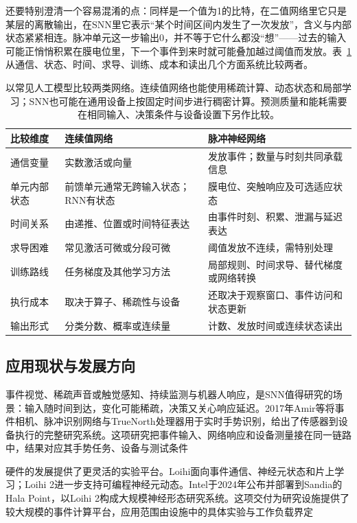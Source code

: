 还要特别澄清一个容易混淆的点：同样是一个值为1的比特，在二值网络里它只是某层的离散输出，在SNN里它表示“某个时间区间内发生了一次发放”，含义与内部状态紧紧相连。脉冲单元这一步输出0，并不等于它什么都没“想”——过去的输入可能正悄悄积累在膜电位里，下一个事件到来时就可能叠加越过阈值而发放。表~\ref{tab:snn-ann-comparison}从通信、状态、时间、求导、训练、成本和读出几个方面系统比较两者。
\begin{table}[htbp]
  \centering\small
  \begin{tabularx}{\linewidth}{@{}p{25mm}XX@{}}
    \toprule
    比较维度 & 连续值网络 & 脉冲神经网络 \\
    \midrule
    通信变量 & 实数激活或向量 & 发放事件；数量与时刻共同承载信息 \\
    单元内部状态 & 前馈单元通常无跨输入状态；RNN有状态 & 膜电位、突触响应及可选适应状态 \\
    时间关系 & 由递推、位置或时间特征表达 & 由事件时刻、积累、泄漏与延迟表达 \\
    求导困难 & 常见激活可微或分段可微 & 阈值发放不连续，需特别处理 \\
    训练路线 & 任务梯度及其他学习方法 & 局部规则、时间求导、替代梯度或网络转换 \\
    执行成本 & 取决于算子、稀疏性与设备 & 还取决于观察窗口、事件访问和状态更新 \\
    输出形式 & 分类分数、概率或连续量 & 计数、发放时间或连续状态读出 \\
    \bottomrule
  \end{tabularx}
  \caption{以常见人工模型比较两类网络。连续值网络也能使用稀疏计算、动态状态和局部学习；SNN也可能在通用设备上按固定时间步进行稠密计算。预测质量和能耗需要在相同输入、决策条件与设备设置下另作比较。}
  \label{tab:snn-ann-comparison}
\end{table}
\FloatBarrier

\subsection{应用现状与发展方向}
\label{sec:snn-development}

事件视觉、稀疏声音或触觉感知、持续监测与机器人响应，是SNN值得研究的场景：输入随时间到达，变化可能稀疏，决策又关心响应延迟。2017年Amir等将事件相机、脉冲识别网络与TrueNorth处理器用于实时手势识别，给出了传感器到设备执行的完整研究系统。这项研究把事件输入、网络响应和设备测量接在同一链路中，结果对应其手势任务、设备与测试条件

硬件的发展提供了更灵活的实验平台。Loihi面向事件通信、神经元状态和片上学习；Loihi 2进一步支持可编程神经元动态。Intel于2024年公布并部署到Sandia的Hala Point，以Loihi 2构成大规模神经形态研究系统。这项交付为研究设施提供了较大规模的事件计算平台，应用范围由设施中的具体实验与工作负载界定

